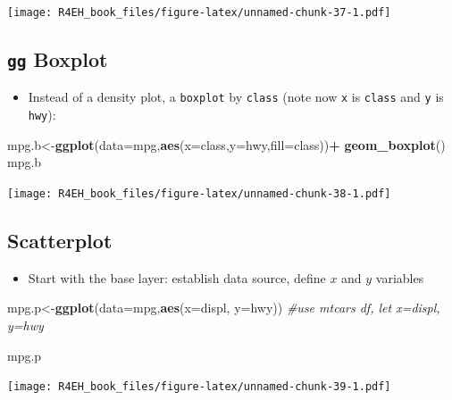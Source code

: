 \documentclass[]{book}
\newenvironment{Shaded}{\begin{snugshade}}{\end{snugshade}}
\newcommand{\KeywordTok}[1]{\textcolor[rgb]{0.13,0.29,0.53}{\textbf{#1}}}
\newcommand{\DataTypeTok}[1]{\textcolor[rgb]{0.13,0.29,0.53}{#1}}
\newcommand{\StringTok}[1]{\textcolor[rgb]{0.31,0.60,0.02}{#1}}
\newcommand{\CommentTok}[1]{\textcolor[rgb]{0.56,0.35,0.01}{\textit{#1}}}
\newcommand{\OperatorTok}[1]{\textcolor[rgb]{0.81,0.36,0.00}{\textbf{#1}}}
\newcommand{\NormalTok}[1]{#1}
\providecommand{\tightlist}{%
  \setlength{\itemsep}{0pt}\setlength{\parskip}{0pt}}
\theoremstyle{definition}
\theoremstyle{definition}
\theoremstyle{definition}
\theoremstyle{remark}
\begin{document}
\texttt{[image: R4EH\_book\_files/figure-latex/unnamed-chunk-37-1.pdf]}

\subsection{\texorpdfstring{\texttt{gg}
Boxplot}{gg Boxplot}}\label{gg-boxplot}

\begin{itemize}
\tightlist
\item
  Instead of a density plot, a \texttt{boxplot} by \texttt{class} (note
  now \texttt{x} is \texttt{class} and \texttt{y} is \texttt{hwy}):
\end{itemize}

\begin{Shaded}
\begin{Highlighting}[]
\NormalTok{mpg.b<-}\KeywordTok{ggplot}\NormalTok{(}\DataTypeTok{data=}\NormalTok{mpg,}\KeywordTok{aes}\NormalTok{(}\DataTypeTok{x=}\NormalTok{class,}\DataTypeTok{y=}\NormalTok{hwy,}\DataTypeTok{fill=}\NormalTok{class))}\OperatorTok{+}
\StringTok{  }\KeywordTok{geom_boxplot}\NormalTok{()}
\NormalTok{mpg.b}
\end{Highlighting}
\end{Shaded}

\texttt{[image: R4EH\_book\_files/figure-latex/unnamed-chunk-38-1.pdf]}

\subsection{Scatterplot}\label{scatterplot-1}

\begin{itemize}
\tightlist
\item
  Start with the base layer: establish data source, define \(x\) and
  \(y\) variables
\end{itemize}

\begin{Shaded}
\begin{Highlighting}[]
\NormalTok{mpg.p<-}\KeywordTok{ggplot}\NormalTok{(}\DataTypeTok{data=}\NormalTok{mpg,}\KeywordTok{aes}\NormalTok{(}\DataTypeTok{x=}\NormalTok{displ, }\DataTypeTok{y=}\NormalTok{hwy)) }\CommentTok{#use mtcars df, let x=displ, y=hwy}

\NormalTok{mpg.p}
\end{Highlighting}
\end{Shaded}

\texttt{[image: R4EH\_book\_files/figure-latex/unnamed-chunk-39-1.pdf]}
\end{document}
